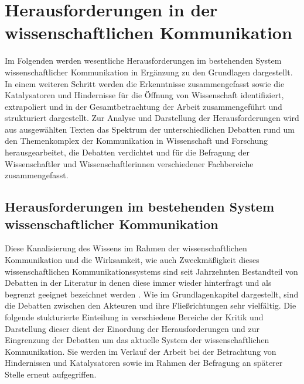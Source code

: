 \chapter{Herausforderungen in der wissenschaftlichen Kommunikation}

Im Folgenden werden wesentliche Herausforderungen im bestehenden System wissenschaftlicher Kommunikation in Ergänzung zu den Grundlagen dargestellt. In einem weiteren Schritt werden die Erkenntnisse zusammengefasst sowie die Katalysatoren und Hindernisse für die Öffnung von Wissenschaft identifiziert, extrapoliert und in der Gesamtbetrachtung der Arbeit zusammengeführt und strukturiert dargestellt. Zur Analyse und Darstellung der Herausforderungen wird aus ausgewählten Texten das Spektrum der unterschiedlichen Debatten rund um den Themenkomplex der Kommunikation in Wissenschaft und Forschung herausgearbeitet, die Debatten verdichtet und für die Befragung der Wissenschaftler und Wissenschaftlerinnen verschiedener Fachbereiche zusammengefasst.

\section{Herausforderungen im bestehenden System wissenschaftlicher Kommunikation}

Diese Kanalisierung des Wissens im Rahmen der wissenschaftlichen Kommunikation und die Wirksamkeit, wie auch Zweckmäßigkeit dieses wissenschaftlichen Kommunikationssystems sind seit Jahrzehnten Bestandteil von Debatten in der Literatur \cite{Simon_2010} in denen diese immer wieder hinterfragt und als begrenzt geeignet bezeichnet werden \cite{Hornbostel_1997} \cite{Hicks_1996} \cite{Havemann_2002} \cite{Warnke_2012} \cite{Brembs_2013a}. Wie im Grundlagenkapitel dargestellt, sind die Debatten zwischen den Akteuren und ihre Fließrichtungen sehr vielfältig. Die folgende stukturierte Einteilung in verschiedene Bereiche der Kritik und Darstellung dieser dient der Einordung der Herausforderungen und zur Eingrenzung der Debatten um das aktuelle System der wissenschaftlichen Kommunikation. Sie werden im Verlauf der Arbeit bei der Betrachtung von Hindernissen und Katalysatoren sowie im Rahmen der Befragung an späterer Stelle erneut aufgegriffen.

